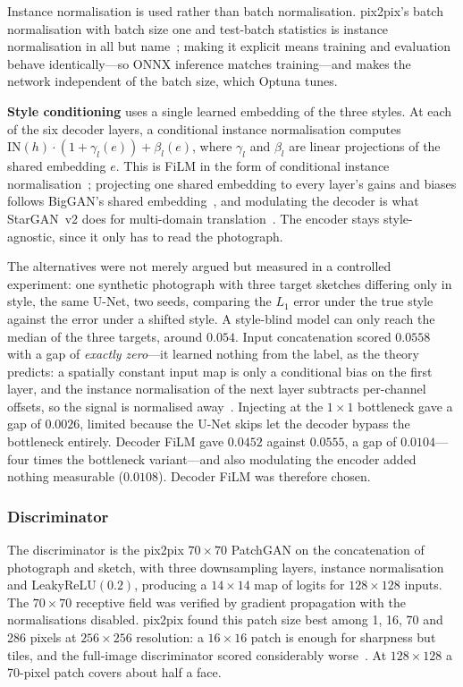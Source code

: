 \documentclass[conference]{IEEEtran}
\begin{document}
Instance normalisation is used rather than batch normalisation. pix2pix's batch
normalisation with batch size one and test-batch statistics is instance
normalisation in all but name~\cite{isola2017image,ulyanov2016instance}; making
it explicit means training and evaluation behave identically---so ONNX inference
matches training---and makes the network independent of the batch size, which
Optuna tunes.

\textbf{Style conditioning} uses a single learned embedding of the three styles.
At each of the six decoder layers, a conditional instance normalisation computes
$\mathrm{IN}(h) \cdot (1 + \gamma_l(e)) + \beta_l(e)$, where $\gamma_l$ and
$\beta_l$ are linear projections of the shared embedding $e$. This is FiLM in
the form of conditional instance
normalisation~\cite{perez2018film,dumoulin2017learned,dumoulin2018featurewise};
projecting one shared embedding to every layer's gains and biases follows
BigGAN's shared embedding~\cite{brock2019large}, and modulating the decoder is
what StarGAN~v2 does for multi-domain translation~\cite{choi2020starganv2,huang2017arbitrary}.
The encoder stays style-agnostic, since it only has to read the photograph.

The alternatives were not merely argued but measured in a controlled experiment:
one synthetic photograph with three target sketches differing only in style, the
same U-Net, two seeds, comparing the $L_1$ error under the true style against
the error under a shifted style. A style-blind model can only reach the median of
the three targets, around $0.054$. Input concatenation scored $0.0558$ with a
gap of \emph{exactly zero}---it learned nothing from the label, as the theory
predicts: a spatially constant input map is only a conditional bias on the first
layer, and the instance normalisation of the next layer subtracts per-channel
offsets, so the signal is normalised away~\cite{dumoulin2018featurewise}.
Injecting at the $1\times1$ bottleneck gave a gap of $0.0026$, limited because
the U-Net skips let the decoder bypass the bottleneck entirely. Decoder FiLM gave
$0.0452$ against $0.0555$, a gap of $0.0104$---four times the bottleneck
variant---and also modulating the encoder added nothing measurable ($0.0108$).
Decoder FiLM was therefore chosen.

\subsubsection{Discriminator}

The discriminator is the pix2pix $70\times70$ PatchGAN on the concatenation of
photograph and sketch, with three downsampling layers, instance normalisation and
LeakyReLU$(0.2)$, producing a $14\times14$ map of logits for $128\times128$
inputs. The $70\times70$ receptive field was verified by gradient propagation
with the normalisations disabled. pix2pix found this patch size best among 1, 16,
70 and 286 pixels at $256\times256$ resolution: a $16\times16$ patch is enough for
sharpness but tiles, and the full-image discriminator scored considerably
worse~\cite{isola2017image}. At $128\times128$ a 70-pixel patch covers about half
a face.
\end{document}
